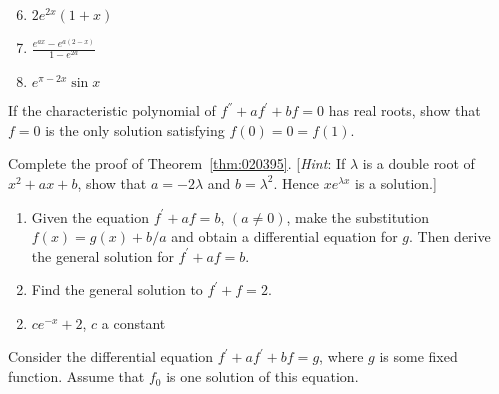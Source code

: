 \begin{multicols}{2}
\begin{ex}
\begin{sol}
\begin{enumerate}[label={\alph*.}]
\setcounter{enumi}{5}
\item  $2e^{2x}(1 + x)$

\setcounter{enumi}{7}
\item  $\frac{e^{ax} - e^{a(2 - x)}}{1 - e^{2a}}$

\setcounter{enumi}{9}
\item  $e^{\pi-2x} \sin x$

\end{enumerate}
\end{sol}
\end{ex}

\begin{ex}
If the characteristic polynomial of \newline $f^\dprime + af^\prime + bf = 0$ has real roots, show that $f = 0$ is the only solution satisfying $f(0) = 0 = f(1)$.
\end{ex}

\begin{ex} \label{ex:6_6_3}
Complete the proof of Theorem~\ref{thm:020395}. [\textit{Hint}: If $\lambda$ is a double root of $x^{2} + ax + b$, show that $a = -2\lambda$ and $b = \lambda^{2}$. Hence $xe^{\lambda x}$ is a solution.]
\end{ex}

\columnbreak 

\begin{ex}
\begin{enumerate}[label={\alph*.}]
\item Given the equation $f^\prime + af = b$, $(a \neq 0)$, make the
  substitution $f(x) = g(x) + b/a$ and obtain a differential equation for $g$. Then derive the general solution for $f^\prime + af = b$.

\item Find the general solution to $f^\prime + f = 2$.

\end{enumerate}
\begin{sol}
\begin{enumerate}[label={\alph*.}]
\setcounter{enumi}{1}
\item  $ce^{-x} + 2$, $c$ a constant

\end{enumerate}
\end{sol}
\end{ex}

\begin{ex}
Consider the differential equation \newline $f^\prime + af^\prime + bf = g$, where $g$ is some fixed function. Assume that $f_{0}$ is one solution of this equation.


\end{ex}
\end{multicols}

